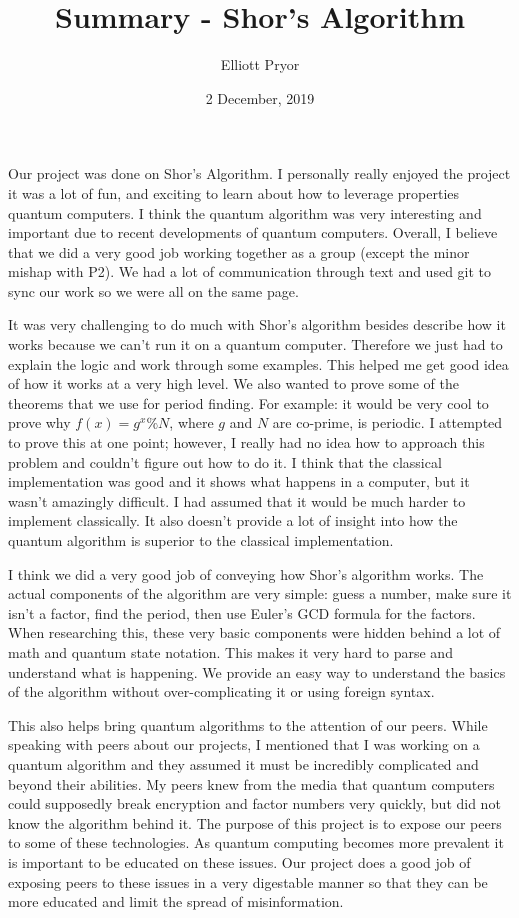 \documentclass[a4paper]{article}
\title{Summary - Shor's Algorithm}
\author{Elliott Pryor}
\date{2 December, 2019}
\begin{document}
\maketitle %


Our project was done on Shor's Algorithm. I personally really enjoyed the project it was a lot of fun, and exciting to learn about how to leverage properties quantum computers. I think the quantum algorithm was very interesting and important due to recent developments of quantum computers. Overall, I believe that we did a very good job working together as a group (except the minor mishap with P2). We had a lot of communication through text and used git to sync our work so we were all on the same page. 

It was very challenging to do much with Shor's algorithm besides describe how it works because we can't run it on a quantum computer. Therefore we just had to explain the logic and work through some examples. This helped me get good idea of how it works at a very high level. We also wanted to prove some of the theorems that we use for period finding. For example: it would be very cool to prove why $f(x) = g^x \% N$, where $g$ and $N$ are co-prime, is periodic. I attempted to prove this at one point; however, I really had no idea how to approach this problem and couldn't figure out how to do it. I think that the classical implementation was good and it shows what happens in a computer, but it wasn't amazingly difficult. I had assumed that it would be much harder to implement classically. It also doesn't provide a lot of insight into how the quantum algorithm is superior to the classical implementation. 

I think we did a very good job of conveying how Shor's algorithm works. The actual components of the algorithm are very simple: guess a number, make sure it isn't a factor, find the period, then use Euler's GCD formula for the factors. When researching this, these very basic components were hidden behind a lot of math and quantum state notation. This makes it very hard to parse and understand what is happening. We provide an easy way to  understand the basics of the algorithm without over-complicating it or using foreign syntax. 

This also helps bring quantum algorithms to the attention of our peers. While speaking with peers about our projects, I mentioned that I was working on a quantum algorithm and they assumed it must be incredibly complicated and beyond their abilities. My peers knew from the media that quantum computers could supposedly break encryption and factor numbers very quickly, but did not know the algorithm behind it. The purpose of this project is to expose our peers to some of these technologies. As quantum computing becomes more prevalent it is important to be educated on these issues. Our project does a good job of exposing peers to these issues in a very digestable manner so that they can be more educated and limit the spread of  misinformation.
\end{document}
